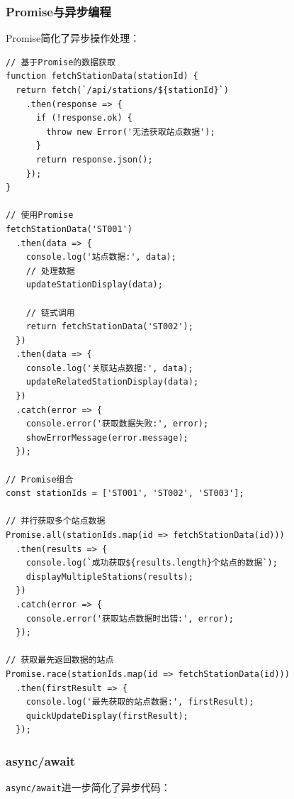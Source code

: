 \subsubsection{Promise与异步编程}\label{promiseux4e0eux5f02ux6b65ux7f16ux7a0b}

Promise简化了异步操作处理：

\begin{lstlisting}
// 基于Promise的数据获取
function fetchStationData(stationId) {
  return fetch(`/api/stations/${stationId}`)
    .then(response => {
      if (!response.ok) {
        throw new Error('无法获取站点数据');
      }
      return response.json();
    });
}

// 使用Promise
fetchStationData('ST001')
  .then(data => {
    console.log('站点数据:', data);
    // 处理数据
    updateStationDisplay(data);
    
    // 链式调用
    return fetchStationData('ST002');
  })
  .then(data => {
    console.log('关联站点数据:', data);
    updateRelatedStationDisplay(data);
  })
  .catch(error => {
    console.error('获取数据失败:', error);
    showErrorMessage(error.message);
  });

// Promise组合
const stationIds = ['ST001', 'ST002', 'ST003'];

// 并行获取多个站点数据
Promise.all(stationIds.map(id => fetchStationData(id)))
  .then(results => {
    console.log(`成功获取${results.length}个站点的数据`);
    displayMultipleStations(results);
  })
  .catch(error => {
    console.error('获取站点数据时出错:', error);
  });

// 获取最先返回数据的站点
Promise.race(stationIds.map(id => fetchStationData(id)))
  .then(firstResult => {
    console.log('最先获取的站点数据:', firstResult);
    quickUpdateDisplay(firstResult);
  });
\end{lstlisting}

\subsubsection{async/await}\label{asyncawait}

\passthrough{\lstinline!async/await!}进一步简化了异步代码：

